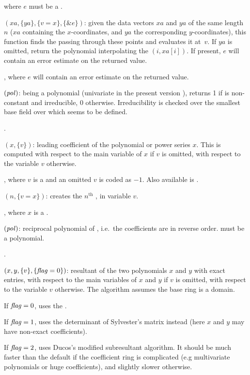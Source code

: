  where $e$ must be a .

$(xa,\{ya\},\{v=x\},\{\&e\})$: given the data vectors
$xa$ and $ya$ of the same length $n$ ($xa$ containing the $x$-coordinates,
and $ya$ the corresponding $y$-coordinates), this function finds the
 passing through these points and evaluates it
at~$v$. If $ya$ is omitted, return the polynomial interpolating the
$(i,xa[i])$. If present, $e$ will contain an error estimate on the returned
value.

, where $e$ will contain an error estimate on the
returned value.

$(\hbox{\it pol\/})$:  being a polynomial
(univariate in the present version \vers), returns 1 if  is
non-constant and irreducible, 0 otherwise. Irreducibility is checked over
the smallest base field over which  seems to be defined.

.

$(x,\{v\})$: leading coefficient of the polynomial or
power series $x$. This is computed with respect to the main variable of $x$
if $v$ is omitted, with respect to the variable $v$ otherwise.

, where $v$ is a  and an omitted $v$ is coded as
$-1$. Also available is .

$(n,\{v=x\})$: creates the $n^{\text{th}}$
, in variable $v$.

, where $x$ is a .

$(\hbox{\it pol\/})$: reciprocal polynomial of ,
i.e.~the coefficients are in reverse order.  must be a polynomial.

.

$(x,y,\{v\},\{\hbox{\it f\kern0pt lag\/}=0\})$: resultant of the two
polynomials $x$ and $y$ with exact entries, with respect to the main
variables of $x$ and $y$ if $v$ is omitted, with respect to the variable $v$
otherwise. The algorithm assumes the base ring is a domain.

If $\hbox{\it f\kern0pt lag\/}=0$, uses the .

If $\hbox{\it f\kern0pt lag\/}=1$, uses the determinant of Sylvester's matrix instead (here $x$ and
$y$ may have non-exact coefficients).

If $\hbox{\it f\kern0pt lag\/}=2$, uses Ducos's modified subresultant algorithm. It should be much
faster than the default if the coefficient ring is complicated (e.g
multivariate polynomials or huge coefficients), and slightly slower
otherwise.


